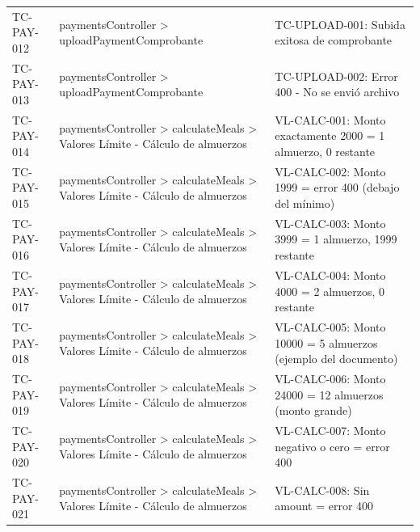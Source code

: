 \begin{longtable}{l L{0.30\textwidth} L{0.40\textwidth}}
TC-PAY-012 & paymentsController > uploadPaymentComprobante & TC-UPLOAD-001: Subida exitosa de comprobante \\
TC-PAY-013 & paymentsController > uploadPaymentComprobante & TC-UPLOAD-002: Error 400 - No se envió archivo \\
TC-PAY-014 & paymentsController > calculateMeals > Valores Límite - Cálculo de almuerzos & VL-CALC-001: Monto exactamente 2000 = 1 almuerzo, 0 restante \\
TC-PAY-015 & paymentsController > calculateMeals > Valores Límite - Cálculo de almuerzos & VL-CALC-002: Monto 1999 = error 400 (debajo del mínimo) \\
TC-PAY-016 & paymentsController > calculateMeals > Valores Límite - Cálculo de almuerzos & VL-CALC-003: Monto 3999 = 1 almuerzo, 1999 restante \\
TC-PAY-017 & paymentsController > calculateMeals > Valores Límite - Cálculo de almuerzos & VL-CALC-004: Monto 4000 = 2 almuerzos, 0 restante \\
TC-PAY-018 & paymentsController > calculateMeals > Valores Límite - Cálculo de almuerzos & VL-CALC-005: Monto 10000 = 5 almuerzos (ejemplo del documento) \\
TC-PAY-019 & paymentsController > calculateMeals > Valores Límite - Cálculo de almuerzos & VL-CALC-006: Monto 24000 = 12 almuerzos (monto grande) \\
TC-PAY-020 & paymentsController > calculateMeals > Valores Límite - Cálculo de almuerzos & VL-CALC-007: Monto negativo o cero = error 400 \\
TC-PAY-021 & paymentsController > calculateMeals > Valores Límite - Cálculo de almuerzos & VL-CALC-008: Sin amount = error 400 \\
\end{longtable}

